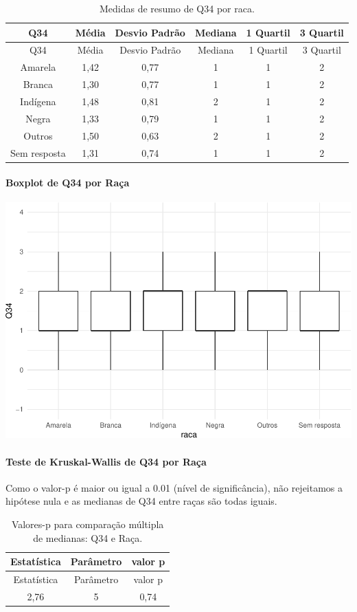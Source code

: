 \documentclass[]{article}
\let\oldparagraph\paragraph
\renewcommand{\paragraph}[1]{\oldparagraph{#1}\mbox{}}
\begin{document}
\begin{longtable}[]{@{}cccccc@{}}
\caption{\label{tab:unnamed-chunk-1227}Medidas de resumo de Q34 por raca.}\tabularnewline
\toprule
Q34 & Média & Desvio Padrão & Mediana & 1 Quartil & 3 Quartil\tabularnewline
\midrule
\endfirsthead
\toprule
Q34 & Média & Desvio Padrão & Mediana & 1 Quartil & 3 Quartil\tabularnewline
\midrule
\endhead
Amarela & 1,42 & 0,77 & 1 & 1 & 2\tabularnewline
Branca & 1,30 & 0,77 & 1 & 1 & 2\tabularnewline
Indígena & 1,48 & 0,81 & 2 & 1 & 2\tabularnewline
Negra & 1,33 & 0,79 & 1 & 1 & 2\tabularnewline
Outros & 1,50 & 0,63 & 2 & 1 & 2\tabularnewline
Sem resposta & 1,31 & 0,74 & 1 & 1 & 2\tabularnewline
\bottomrule
\end{longtable}

\hypertarget{boxplot-de-q34-por-rauxe7a}{%
\paragraph{Boxplot de Q34 por Raça}\label{boxplot-de-q34-por-rauxe7a}}

\begin{center}\includegraphics[width=0.75\linewidth]{relatorio_covid19_files/figure-latex/unnamed-chunk-1228-1} \end{center}

\hypertarget{teste-de-kruskal-wallis-de-q34-por-rauxe7a}{%
\paragraph{Teste de Kruskal-Wallis de Q34 por Raça}\label{teste-de-kruskal-wallis-de-q34-por-rauxe7a}}

Como o valor-p é maior ou igual a 0.01 (nível de significância), não rejeitamos a hipótese nula e as medianas de Q34 entre raças são todas iguais.

\begin{longtable}[]{@{}ccc@{}}
\caption{\label{tab:unnamed-chunk-1230}Valores-p para comparação múltipla de medianas: Q34 e Raça.}\tabularnewline
\toprule
Estatística & Parâmetro & valor p\tabularnewline
\midrule
\endfirsthead
\toprule
Estatística & Parâmetro & valor p\tabularnewline
\midrule
\endhead
2,76 & 5 & 0,74\tabularnewline
\bottomrule
\end{longtable}
\end{document}
